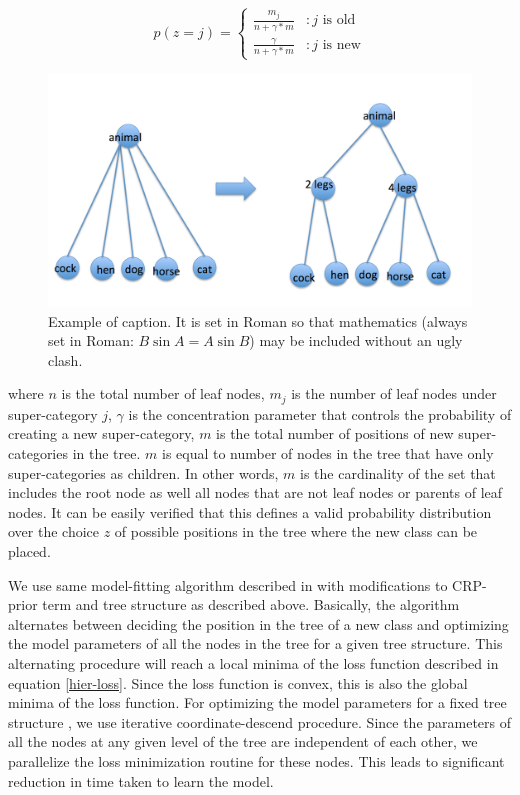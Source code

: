 \documentclass[10pt,twocolumn,letterpaper]{article}
\begin{document}
 \begin{displaymath}
 p(z=j) = \left \{
	    \begin{array}{lr}
 		\frac{m_{j}}{n+\gamma*m} & : \text{$j$ is old} \\
		\frac{\gamma}{n+\gamma*m} & : \text{$j$ is new}
	   \end{array}
	  \right.
 \end{displaymath} 
 
  \begin{figure}[t]
  	\begin{center}
  		\includegraphics[width=0.8\linewidth]{split}
  	\end{center}
  	\caption{Example of caption.  It is set in Roman so that mathematics
  		(always set in Roman: $B \sin A = A \sin B$) may be included without an
  		ugly clash.}
  	\label{fig:long}
  	\label{fig:onecol}
  \end{figure}
where $n$ is the total number of leaf nodes, $m_{j}$
is the number of leaf nodes under super-category $j$,
$\gamma$ is the concentration parameter that controls the probability of creating a new super-category,
$m$ is the total number of positions of new super-categories in the tree. $m$ is equal to number of nodes
in the tree that have only super-categories as children. In other words, $m$ is the cardinality of the set that 
includes the root node as well all nodes that are not leaf nodes or parents of leaf nodes. It can be easily verified that 
this defines a valid probability distribution over the choice $z$ of possible positions in the tree where the new class can be placed.

We use same model-fitting algorithm described in \cite{ruslan} with modifications to CRP-prior term and tree structure as described above.
Basically, the algorithm alternates between deciding the position in the tree of a new class and optimizing the model parameters of all the nodes
in the tree for a given tree structure.  This alternating procedure will reach a local minima of the loss function 
described in equation \ref{hier-loss}. Since the loss function is convex, this is also the global minima of the loss function. 
For optimizing the model parameters for a fixed tree structure , we use iterative coordinate-descend procedure.
Since the parameters of all the nodes at any given level of the tree are independent of each other, we parallelize the loss minimization 
routine for these nodes. This leads to significant reduction in time taken to learn the model.
\end{document}
